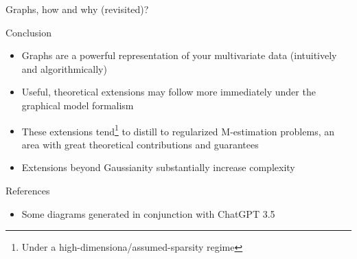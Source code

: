 \documentclass{beamer}
\begin{document}
\begin{frame}{Graphs, how and why (revisited)?}
    \centering
\end{frame}


\begin{frame}{Conclusion}
    \begin{itemize}
        \item Graphs are a powerful representation of your multivariate data (intuitively and algorithmically)
        \item Useful, theoretical extensions may follow more immediately under the graphical model formalism 
        \item These extensions tend\footnote{Under a high-dimensiona/assumed-sparsity regime} to distill to regularized M-estimation problems, an area with great theoretical contributions and guarantees
        \item Extensions beyond Gaussianity substantially increase complexity 
    \end{itemize}
\end{frame}


\begin{frame}[allowframebreaks]{References}
    \begin{itemize}
    \item Some diagrams generated in conjunction with ChatGPT 3.5
    \end{itemize}
    \printbibliography 
\end{frame}
\end{document}
